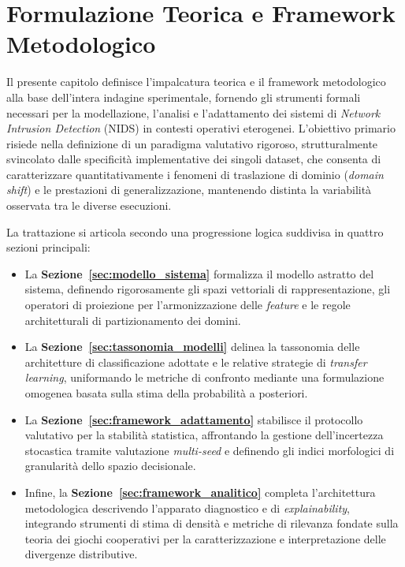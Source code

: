 \chapter{Formulazione Teorica e Framework Metodologico}
\label{ch:metodologia}

Il presente capitolo definisce l'impalcatura teorica e il framework metodologico alla base dell'intera indagine sperimentale, fornendo gli strumenti formali necessari per la modellazione, l'analisi e l'adattamento dei sistemi di \textit{Network Intrusion Detection} (NIDS) in contesti operativi eterogenei. 
L'obiettivo primario risiede nella definizione di un paradigma valutativo rigoroso, strutturalmente svincolato dalle specificità implementative dei singoli dataset, che consenta di caratterizzare quantitativamente i fenomeni di traslazione di dominio (\textit{domain shift}) e le prestazioni di generalizzazione, mantenendo distinta la variabilità osservata tra le diverse esecuzioni.

La trattazione si articola secondo una progressione logica suddivisa in quattro sezioni principali:
\begin{itemize}
    \item La \textbf{Sezione~\ref{sec:modello_sistema}} formalizza il modello astratto del sistema, definendo rigorosamente gli spazi vettoriali di rappresentazione, gli operatori di proiezione per l'armonizzazione delle \textit{feature} e le regole architetturali di partizionamento dei domini.
    \item La \textbf{Sezione~\ref{sec:tassonomia_modelli}} delinea la tassonomia delle architetture di classificazione adottate e le relative strategie di \textit{transfer learning}, uniformando le metriche di confronto mediante una formulazione omogenea basata sulla stima della probabilità a posteriori.
    \item La \textbf{Sezione~\ref{sec:framework_adattamento}} stabilisce il protocollo valutativo per la stabilità statistica, affrontando la gestione dell'incertezza stocastica tramite valutazione \textit{multi-seed} e definendo gli indici morfologici di granularità dello spazio decisionale.
    \item Infine, la \textbf{Sezione~\ref{sec:framework_analitico}} completa l'architettura metodologica descrivendo l'apparato diagnostico e di \textit{explainability}, integrando strumenti di stima di densità e metriche di rilevanza fondate sulla teoria dei giochi cooperativi per la caratterizzazione e interpretazione delle divergenze distributive.
\end{itemize}

